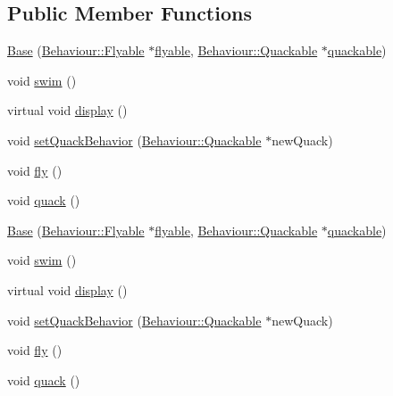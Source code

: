 \subsection*{Public Member Functions}
\begin{DoxyCompactItemize}
\item 
\hyperlink{classDuck_1_1Base_ab657fde28f50e206e21f4325fe0c79db}{Base} (\hyperlink{classDuck_1_1Behaviour_1_1Flyable}{Behaviour\-::\-Flyable} $\ast$\hyperlink{classDuck_1_1Base_aa0d116b55dc759d6d5c01eeb9af5add9}{flyable}, \hyperlink{classDuck_1_1Behaviour_1_1Quackable}{Behaviour\-::\-Quackable} $\ast$\hyperlink{classDuck_1_1Base_ae34ecb3b0d147b27551f401cae8f0ebb}{quackable})
\item 
void \hyperlink{classDuck_1_1Base_a1c72783da226ddefacfb4dc4ef0f46e2}{swim} ()
\item 
virtual void \hyperlink{classDuck_1_1Base_a18415db6c7c55e69fdbb0af2117fab5a}{display} ()
\item 
void \hyperlink{classDuck_1_1Base_a8257773259d768702279242b5c8dc822}{set\-Quack\-Behavior} (\hyperlink{classDuck_1_1Behaviour_1_1Quackable}{Behaviour\-::\-Quackable} $\ast$new\-Quack)
\item 
void \hyperlink{classDuck_1_1Base_a29bb853c2b67718ff8844cebd9b418f0}{fly} ()
\item 
void \hyperlink{classDuck_1_1Base_a8979b42c246c31e18f93ca519eca68c1}{quack} ()
\item 
\hyperlink{classDuck_1_1Base_ab657fde28f50e206e21f4325fe0c79db}{Base} (\hyperlink{classDuck_1_1Behaviour_1_1Flyable}{Behaviour\-::\-Flyable} $\ast$\hyperlink{classDuck_1_1Base_aa0d116b55dc759d6d5c01eeb9af5add9}{flyable}, \hyperlink{classDuck_1_1Behaviour_1_1Quackable}{Behaviour\-::\-Quackable} $\ast$\hyperlink{classDuck_1_1Base_ae34ecb3b0d147b27551f401cae8f0ebb}{quackable})
\item 
void \hyperlink{classDuck_1_1Base_a1c72783da226ddefacfb4dc4ef0f46e2}{swim} ()
\item 
virtual void \hyperlink{classDuck_1_1Base_acb2fc4104b4125035269727bf2c3490a}{display} ()
\item 
void \hyperlink{classDuck_1_1Base_a8257773259d768702279242b5c8dc822}{set\-Quack\-Behavior} (\hyperlink{classDuck_1_1Behaviour_1_1Quackable}{Behaviour\-::\-Quackable} $\ast$new\-Quack)
\item 
void \hyperlink{classDuck_1_1Base_a29bb853c2b67718ff8844cebd9b418f0}{fly} ()
\item 
void \hyperlink{classDuck_1_1Base_a8979b42c246c31e18f93ca519eca68c1}{quack} ()
\end{DoxyCompactItemize}

